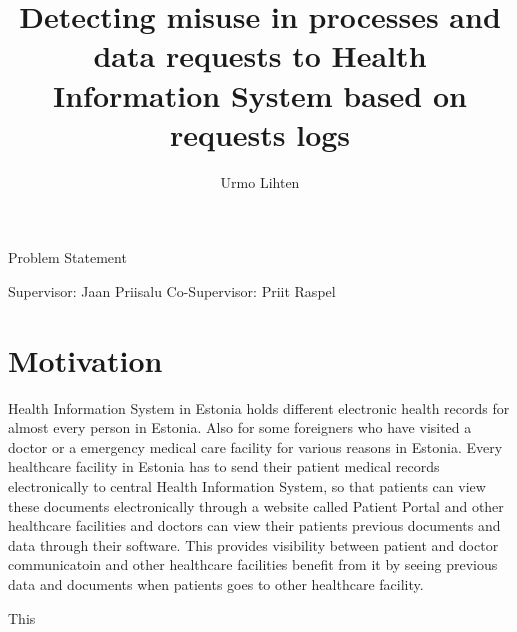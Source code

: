 \documentclass[12pt]{article}
\title{Detecting misuse in processes and data requests to Health Information System based on requests logs}
\author{Urmo Lihten}
\begin{document}

\maketitle

\begin{center}
	Problem Statement
\end{center}
\begin{flushright}
	Supervisor: Jaan Priisalu
	Co-Supervisor: Priit Raspel
\end{flushright}

\section{Motivation}
Health Information System in Estonia holds different electronic health records for almost every person in Estonia. Also for some foreigners who have visited a doctor or a emergency medical care facility for various reasons in Estonia. 
Every healthcare facility in Estonia has to send their patient medical records electronically to central Health Information System, so that patients can view these documents electronically through a website called Patient Portal and other healthcare facilities and doctors can view their patients previous documents and data through their software. This provides visibility between patient and doctor communicatoin and other healthcare facilities benefit from it by seeing previous data and documents when patients goes to other healthcare facility. 

This 
\end{document}

